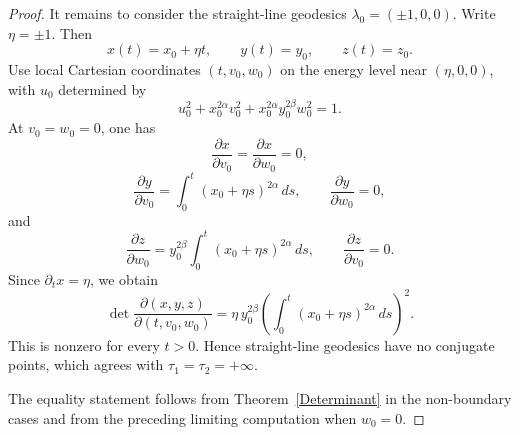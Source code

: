 \documentclass[10pt,a4paper]{amsart}
\begin{document}
\begin{proof}
    It remains to consider the straight-line geodesics \(\lambda_0=(\pm1,0,0)\). Write
    \(\eta=\pm1\). Then
    \[
        x(t)=x_0+\eta t,
        \qquad
        y(t)=y_0,
        \qquad
        z(t)=z_0.
    \]
    Use local Cartesian coordinates \((t,v_0,w_0)\) on the energy level near
    \((\eta,0,0)\), with \(u_0\) determined by
    \[
        u_0^2+x_0^{2\alpha}v_0^2+x_0^{2\alpha}y_0^{2\beta}w_0^2=1.
    \]
    At \(v_0=w_0=0\), one has
    \[
        \frac{\partial x}{\partial v_0}
        =
        \frac{\partial x}{\partial w_0}
        =
        0,
    \]
    \[
        \frac{\partial y}{\partial v_0}
        =
        \int_0^t (x_0+\eta s)^{2\alpha}\,ds,
        \qquad
        \frac{\partial y}{\partial w_0}=0,
    \]
    and
    \[
        \frac{\partial z}{\partial w_0}
        =
        y_0^{2\beta}
        \int_0^t (x_0+\eta s)^{2\alpha}\,ds,
        \qquad
        \frac{\partial z}{\partial v_0}=0.
    \]
    Since \(\partial_t x=\eta\), we obtain
    \begin{equation}\label{e.straight-line-det}
        \det
        \frac{\partial(x,y,z)}
        {\partial(t,v_0,w_0)}
        =
        \eta\,y_0^{2\beta}
        \left(
        \int_0^t (x_0+\eta s)^{2\alpha}\,ds
        \right)^2.
    \end{equation}
    This is nonzero for every \(t>0\). Hence straight-line geodesics have no conjugate
    points, which agrees with \(\tau_1=\tau_2=+\infty\).

    The equality statement follows from Theorem~\ref{Determinant} in the non-boundary cases
    and from the preceding limiting computation when \(w_0=0\).
\end{proof}
\end{document}
